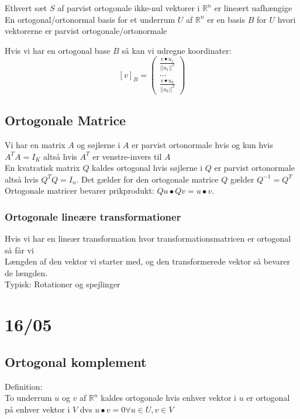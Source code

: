 \documentclass[a4paper,fleqn]{report}
\newcommand{\RR}{\mathbb{R}}
\begin{document}
	Ethvert sæt $S$ af parvist ortogonale ikke-nul vektorer i $\RR^n$ er lineært uafhængige\\
	En ortogonal/ortonormal basis for et underrum $U$ af $\RR^n$ er en basis $B$ for $U$ hvori
	vektorerne er parvist ortogonale/ortonormale

	Hvis vi har en ortogonal base $B$ så kan vi udregne koordinater: 
	\[ [v]_B = \begin{pmatrix} \frac{v\bullet u_1}{||u_1||^2}\\\dots\\\frac{v\bullet u_k}{||u_k||^2}\end{pmatrix}\]

	\section{Ortogonale Matrice}
	Vi har en matrix $A$ og søjlerne i $A$ er parvist ortonormale hvis og kun hvis $A^TA = I_K$
	altså hvis $A^T$ er venstre-invers til $A$\\

	En kvatratisk matrix $Q$ kaldes ortogonal hvis søjlerne i $Q$ er parvist ortonormale altså
	hvis $Q^TQ = I_n$. Det gælder for den ortogonale matrice $Q$ gælder $Q^{-1} = Q^T$\\

	Ortogonale matricer bevarer prikprodukt: $Qu \bullet Qv = u \bullet v$.\\

	\subsection{Ortogonale lineære transformationer}
	Hvis vi har en lineær transformation hvor transformationsmatricen er ortogonal så får vi\\
	Længden af den vektor vi starter med, og den transformerede vektor så bevarer de længden.\\
	Typisk: Rotationer og spejlinger

	\chapter{16/05}
	\section{Ortogonal komplement}
	Definition:\\
	To underrum $u$ og $v$ af $\RR^n$ kaldes ortogonale hvis enhver vektor i $u$ er ortogonal
	på enhver vektor i $V$ dvs $u \bullet v = 0 \forall u \in U, v \in V$\\
	
\end{document}
